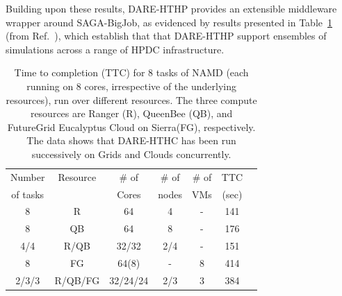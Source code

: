 \documentclass[]{svjour3}
\begin{document}

Building upon these results, DARE-HTHP provides an extensible
middleware wrapper around SAGA-BigJob, as evidenced by results
presented in Table~\ref{table:HTHP-Distributed} (from
Ref.~\cite{ccpe11}), which establish that that DARE-HTHP support
ensembles of simulations across a range of HPDC infrastructure.




 \begin{table}
\centering
\small
 \begin{tabular}{|c|c|c|c|c|c|c|} 
 \hline 
 Number      & Resource  & \# of & \# of   &   \# of   &	TTC \\
of tasks        &   & Cores  &nodes&  VMs & (sec) \\ 
\hline
8& R&	64	&4 & - &141\\
\hline         
8& QB	&	64& 8 &	-&176 \\
\hline
4/4&R/QB	&	32/32 &2/4&-&151\\
\hline
8&FG	&	64(8) & - &8&414 \\
\hline
2/3/3&R/QB/FG	&32/24/24&2/3&	3 &384\\
\hline


\end{tabular}
\caption{Time to completion (TTC) for 8 tasks of NAMD (each running on 8 cores,
 irrespective of the underlying resources), run over different resources. The three
 compute resources are Ranger (R), QueenBee (QB), 
 and FutureGrid Eucalyptus Cloud on Sierra(FG), respectively. The
 data shows that DARE-HTHC has been run successively on Grids and
 Clouds concurrently.}
 \label{table:HTHP-Distributed} 
\end{table}
\end{document}
